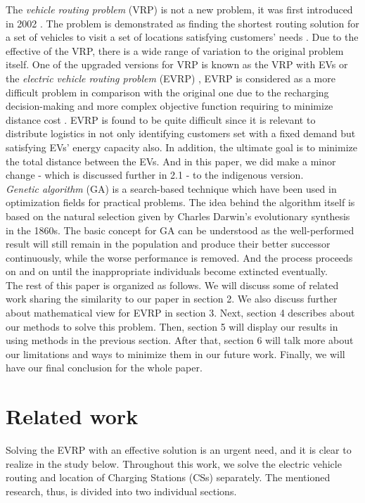 \documentclass[conference,compsoc]{IEEEtran}
\begin{document}
The \textit{vehicle routing problem} (VRP) is not a new problem, it was first introduced in 2002 \cite{vrp}. The problem is demonstrated as finding the shortest routing solution for a set of vehicles to visit a set of locations satisfying customers' needs \cite{vrp_demonstration}. Due to the effective of the VRP, there is a wide range of variation to the original problem itself. One of the upgraded versions for VRP is known as the VRP with EVs or the \textit{electric vehicle routing problem} (EVRP) \cite{evrp}, EVRP is considered as a more difficult problem in comparison with the original one due to the recharging decision-making and more complex objective function requiring to minimize distance cost \cite{evrp_difficulties}. EVRP is found to be quite difficult since it is relevant to distribute logistics in not only identifying customers set with a fixed demand but satisfying EVs' energy capacity also. In addition, the ultimate goal is to minimize the total distance between the EVs. And in this paper, we did make a minor change - which is discussed further in 2.1 - to the indigenous version.\\

\textit{Genetic algorithm} (GA) \cite{GA} is a search-based technique which have been used in optimization fields for practical problems. The idea behind the algorithm itself is based on the natural selection given by Charles Darwin's evolutionary synthesis in the 1860s. The basic concept for GA can be understood as the well-performed result will still remain in the population and produce their better successor continuously, while the worse performance is removed. And the process proceeds on and on until the inappropriate individuals become extincted eventually.\\

The rest of this paper is organized as follows. We will discuss some of related work sharing the similarity to our paper in section 2. We also discuss further about mathematical view for EVRP in section 3. Next, section 4 describes about our methods to solve this problem. Then, section 5 will display our results in using methods in the previous section. After that, section 6 will talk more about our limitations and ways to minimize them in our future work. Finally, we will have our final conclusion for the whole paper.

\section{Related work}
Solving the EVRP with an effective solution is an urgent need, and it is clear to realize in the study below. Throughout this work, we solve the electric vehicle routing and location of Charging Stations (CSs) separately. The mentioned research, thus, is divided into two individual sections.
\end{document}
